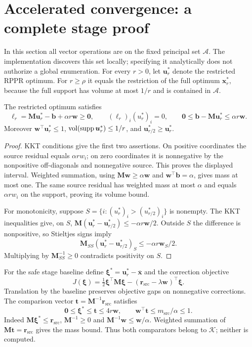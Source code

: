 \section{Accelerated convergence: a complete stage proof}
\label{sec:det-op2-convergence}

In this section all vector operations are on the fixed principal set
$\mathcal A$. The implementation discovers this set locally; specifying it
analytically does not authorize a global enumeration. For every $r>0$, let
$\bm{u}_r^*$ denote the restricted RPPR optimum. For $r\geq\rho$ it equals
the restriction of the full optimum $\bm{x}_r^*$, because the full support
has volume at most $1/r$ and is contained in $\mathcal A$.

\begin{lemma}
\label{lem:det-op2-order}
The restricted optimum satisfies
\[
 \bm{\ell}_r=\bm{M}\bm{u}_r^*-\bm{b}+\alpha r\bm{w}\geq\bm{0},
 \qquad (\ell_r)_i(u_r^*)_i=0,
 \qquad \bm{0}\leq\bm{b}-\bm{M}\bm{u}_r^*\leq\alpha r\bm{w}.
\]
Moreover $\bm{w}^{\top}\bm{u}_r^*\leq1$,
$\operatorname{vol}(\operatorname{supp}\bm{u}_r^*)\leq1/r$, and
$\bm{u}_{r/2}^*\geq\bm{u}_r^*$.
\end{lemma}
\begin{proof}
KKT conditions give the first two assertions. On positive coordinates the
source residual equals $\alpha r w_i$; on zero coordinates it is nonnegative
by the nonpositive off-diagonals and nonnegative source. This proves the
displayed interval. Weighted summation, using
$\bm{M}\bm{w}\geq\alpha\bm{w}$ and $\bm{w}^{\top}\bm{b}=\alpha$,
gives mass at most one. The same source residual has weighted mass at most
$\alpha$ and equals $\alpha r w_i$ on the support, proving its volume bound.

For monotonicity, suppose $S=\{i:(u_r^*)_i>(u_{r/2}^*)_i\}$ is nonempty.
The KKT inequalities give, on $S$,
$\bm{M}(\bm{u}_r^*-\bm{u}_{r/2}^*)\leq-\alpha r\bm{w}/2$.
Outside $S$ the difference is nonpositive, so Stieltjes signs imply
\[
 \bm{M}_{SS}(\bm{u}_r^*-\bm{u}_{r/2}^*)_S
 \leq-\alpha r\bm{w}_S/2.
\]
Multiplying by $\bm{M}_{SS}^{-1}\geq0$ contradicts positivity on $S$.
\end{proof}

For the safe stage baseline define
$\bm{\xi}^*=\bm{u}_r^*-\overline{\bm{x}}$ and the correction objective
\[
 J(\bm{\xi})=\tfrac12\bm{\xi}^{\top}\bm{M}\bm{\xi}
       -(\bm{r}_{\mathrm{src}}-\lambda\bm{w})^{\top}\bm{\xi}.
\]
Translation by the baseline preserves objective gaps on nonnegative
corrections. The comparison vector $\bm{t}=\bm{M}^{-1}\bm{r}_{\mathrm{src}}$
satisfies
\begin{equation}\label{eq:det-op2-comparators}
 \bm{0}\leq\bm{\xi}^*\leq\bm{t}\leq4r\bm{w},\qquad
 \bm{w}^{\top}\bm{t}\leq m_{\mathrm{src}}/\alpha\leq1.
\end{equation}
Indeed $\bm{M}\bm{\xi}^*\leq\bm{r}_{\mathrm{src}}$,
$\bm{M}^{-1}\geq0$ and $\bm{M}^{-1}\bm{w}\leq\bm{w}/\alpha$.
Weighted summation of $\bm{M}\bm{t}=\bm{r}_{\mathrm{src}}$ gives the mass
bound. Thus both comparators belong to $\mathcal K$; neither is computed.

